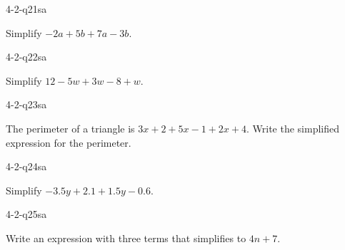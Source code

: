 \begin{practiceQuestion}{4-2-q21}{sa}
\begin{questionText}
Simplify $-2a + 5b + 7a - 3b$.
\end{questionText}
\end{practiceQuestion}

\begin{practiceQuestion}{4-2-q22}{sa}
\begin{questionText}
Simplify $12 - 5w + 3w - 8 + w$.
\end{questionText}
\end{practiceQuestion}

\begin{practiceQuestion}{4-2-q23}{sa}
\begin{questionText}
The perimeter of a triangle is $3x + 2 + 5x - 1 + 2x + 4$. Write the simplified expression for the perimeter.
\end{questionText}
\end{practiceQuestion}

\begin{practiceQuestion}{4-2-q24}{sa}
\begin{questionText}
Simplify $-3.5y + 2.1 + 1.5y - 0.6$.
\end{questionText}
\end{practiceQuestion}

\begin{practiceQuestion}{4-2-q25}{sa}
\begin{questionText}
Write an expression with three terms that simplifies to $4n + 7$.
\end{questionText}
\end{practiceQuestion}


